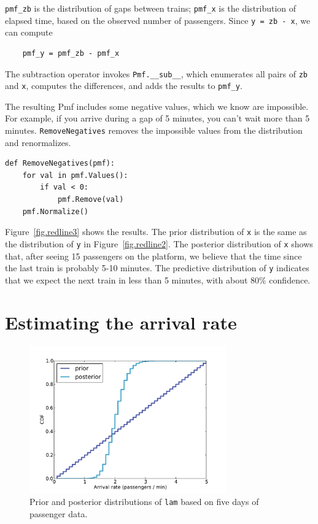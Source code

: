 \documentclass[12pt]{book}
\begin{document}
\verb"pmf_zb" is the distribution of gaps between trains;
\verb"pmf_x" is the distribution of elapsed time, based on
the observed number of passengers.  Since {\tt y = zb - x},
we can compute

\begin{verbatim}
    pmf_y = pmf_zb - pmf_x
\end{verbatim}

The subtraction operator invokes \verb"Pmf.__sub__", which enumerates
all pairs of {\tt zb} and {\tt x}, computes the differences, and adds
the results to \verb"pmf_y".

The resulting Pmf includes some negative values, which we know are
impossible.  For example, if you arrive during a gap of 5 minutes, you
can't wait more than 5 minutes.  {\tt RemoveNegatives} removes the
impossible values from the distribution and renormalizes.

\begin{verbatim}
def RemoveNegatives(pmf):
    for val in pmf.Values():
        if val < 0:
            pmf.Remove(val)
    pmf.Normalize()
\end{verbatim}

Figure~\ref{fig.redline3} shows the results.  The prior distribution
of {\tt x} is the same as the distribution of {\tt y} in
Figure~\ref{fig.redline2}.  The posterior distribution of {\tt x}
shows that, after seeing 15 passengers on the platform, we believe
that the time since the last train is probably 5-10 minutes.  The
predictive distribution of {\tt y} indicates that we expect the next
train in less than 5 minutes, with about 80\% confidence.


\section{Estimating the arrival rate}

\begin{figure}
\centerline{\includegraphics[height=2.5in]{figs/redline1.pdf}}
\caption{Prior and posterior distributions of {\tt lam} based
on five days of passenger data. }
\label{fig.redline1}
\end{figure}
\end{document}
